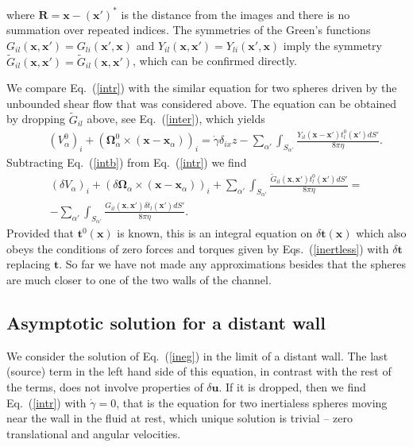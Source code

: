 where $\bm R=\bm x-(\bm x')^*$ is the distance from the images and there is no summation over repeated indices. The symmetries of the Green's functions $G_{il}(\bm x, \bm x')=G_{li}(\bm x', \bm x)$ and $Y_{il}(\bm x, \bm x')=Y_{li}(\bm x', \bm x)$ imply the symmetry ${\tilde G}_{il}(\bm x, \bm x')={\tilde G}_{il}(\bm x, \bm x')$, which can be confirmed directly.

We compare Eq.~(\ref{intr}) with the similar equation for two spheres driven by the unbounded shear flow that was considered above. The equation can be obtained by dropping ${\tilde G}_{il}$ above, see Eq.~(\ref{inter}), which yields
\begin{eqnarray}&&\!\!\!\!\!\!\!\!\!\!\!\!\!\!\!\!
(V^0_{\alpha})_i\!+\!(\bm \Omega^0_{\alpha}\!\times\! (\bm x\!-\!\bm x_{\alpha}))_i\!=\!\dot{\gamma}\delta_{ix}z
-\!\sum_{\alpha'}\int_{S_{\alpha'}}\!\!\!\frac{Y_{il}(\bm x\!-\!\bm x')t^0_{l}(\bm x')dS'}{8\pi \eta}.\label{intb}
\end{eqnarray}
Subtracting Eq.~(\ref{intb}) from Eq.~(\ref{intr}) we find
\begin{equation} \begin{aligned} %
(\delta V_{\alpha})_i\!+\!(\delta\bm \Omega_{\alpha}\!\times\! (\bm x\!-\!\bm x_{\alpha}))_i\!+\!\sum_{\alpha'}\int_{S_{\alpha'}}\!\!\!\frac{{\tilde G}_{il}(\bm x, \bm x')t^0_{l}(\bm x')dS'}{8\pi \eta}\!=\\-\!\sum_{\alpha'}\int_{S_{\alpha'}}\!\!\!\frac{G_{il}(\bm x, \bm x')\delta t_{l}(\bm x')dS'}{8\pi \eta}.\label{ineg}
\end{aligned} \end{equation}
Provided that $\bm t^0(\bm x)$ is known, this is an integral equation on $\delta\bm t(\bm x)$ which also obeys the conditions of zero forces and torques given by Eqs.~(\ref{inertless}) with $\delta \bm t$ replacing $\bm t$. So far we have not made any approximations besides that the spheres are much closer to one of the two walls of the channel. 


\subsection{Asymptotic solution for a distant wall}

We consider the solution of Eq.~(\ref{ineg}) in the limit of a distant wall.
The last (source) term in the left hand side of this equation, in contrast with the rest of the terms, does not involve properties of $\delta\bm u$.
If it is dropped, then we find Eq.~(\ref{intr}) with $\dot{\gamma}=0$, that is the equation for two inertialess spheres moving near the wall in the fluid at rest, which unique solution is trivial -- zero translational and angular velocities.

